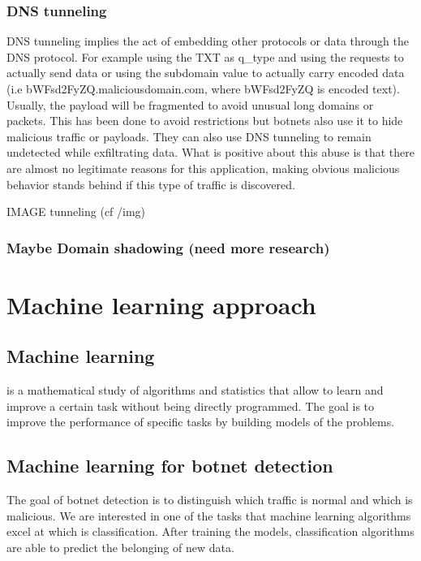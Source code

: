 \subsubsection{DNS tunneling}
DNS tunneling implies the act of embedding other protocols or data through the DNS protocol. For example using the TXT  as q\_type and using the requests to actually send data or  using the subdomain value to actually carry encoded data (i.e bWFsd2FyZQ.maliciousdomain.com, where bWFsd2FyZQ is encoded text). Usually, the payload will be fragmented to avoid unusual long domains or packets. This has been done to avoid restrictions but botnets also use it to hide malicious traffic or payloads. They can also use DNS tunneling to remain undetected while exfiltrating data. \cite{Botnet1}
What is positive about this abuse is that there are almost no legitimate reasons for this application, making obvious malicious behavior stands behind if this type of traffic is discovered.\cite{tunneling}

IMAGE tunneling (cf /img)


\subsubsection{Maybe Domain shadowing (need more research)}
\cite{review2}\cite{detection8}


\section{Machine learning approach}
\subsection{Machine learning} is a mathematical study of algorithms and statistics that allow to learn and improve a certain task without being directly programmed. The goal is to improve the performance of specific tasks by building models of the problems. \cite{ml-def}

\subsection{Machine learning for botnet detection}
The goal of botnet detection is to distinguish which traffic is normal and which is malicious. We are interested in one of the tasks that machine learning algorithms excel at which is classification. After training the models, classification algorithms are able to predict the belonging of new data.

